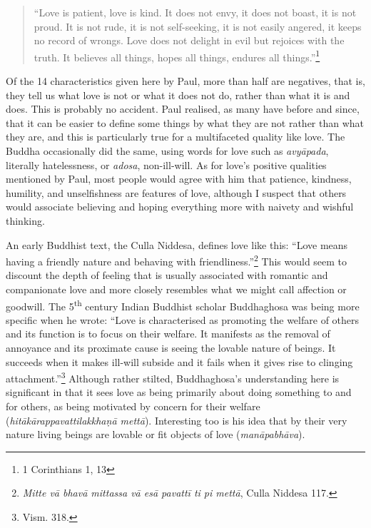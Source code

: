 \documentclass[10pt, openright]{book}
\begin{document}
\begin{quote}

\hspace{-0.4em}“Love is patient, love is kind. It does not envy, it does not boast, it is not proud. It is not rude, it is not self-seeking, it is not easily angered, it keeps no record of wrongs. Love does not delight in evil but rejoices with the truth. It believes all things, hopes all things, endures all things.”\footnote {1 Corinthians 1, 13}


\end{quote}
Of the 14 characteristics given here by Paul, more than half are negatives, that is, they tell us what love is not or what it does not do, rather than what it is and does. This is probably no accident. Paul realised, as many have before and since, that it can be easier to define some things by what they are not rather than what they are, and this is particularly true for a multifaceted quality like love. The Buddha occasionally did the same, using words for love such as \textit{avyāpada}, literally hatelessness, or \textit{adosa}, non-ill-will. As for love’s positive qualities mentioned by Paul, most people would agree with him that patience, kindness, humility, and unselfishness are features of love, although I suspect that others would associate believing and hoping everything more with naivety and wishful thinking.


An early Buddhist text, the Culla Niddesa, defines love like this: “Love means having a friendly nature and behaving with friendliness.”\footnote {\textit{Mitte vā bhavā mittassa vā esā pavattī ti pi mettā}, Culla Niddesa 117.} This would seem to discount the depth of feeling that is usually associated with romantic and companionate love and more closely resembles what we might call affection or goodwill. The 5\textsuperscript{th} century Indian Buddhist scholar Buddhaghosa was being more specific when he wrote: “Love is characterised as promoting the welfare of others and its function is to focus on their welfare. It manifests as the removal of annoyance and its proximate cause is seeing the lovable nature of beings. It succeeds when it makes ill-will subside and it fails when it gives rise to clinging attachment.”\footnote {Vism. 318.} Although rather stilted, Buddhaghosa’s understanding here is significant in that it sees love as being primarily about doing something to and for others, as being motivated by concern for their welfare (\textit{hitākārappavattilakkhaṇā mettā}). Interesting too is his idea that by their very nature living beings are lovable or fit objects of love (\textit{manāpabhāva}).
\end{document}
